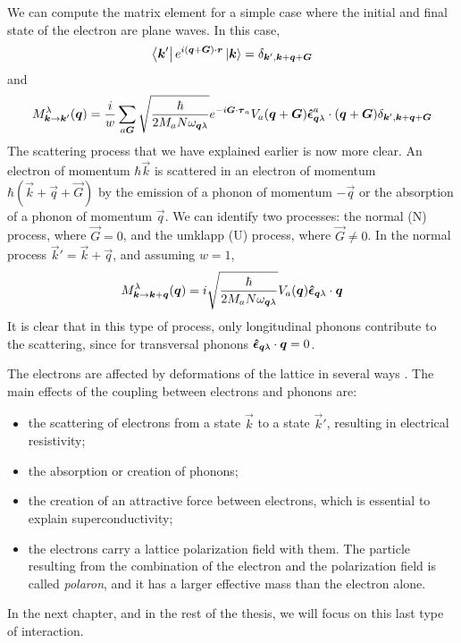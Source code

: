 We can compute the matrix element for a simple case where the initial and final state of the electron are plane waves. In this case,
\begin{equation}
    \bra{\mathbf{\boldsymbol{k}}'} e^{i(\mathbf{\boldsymbol{q}} + \mathbf{\boldsymbol{G}})\cdot \mathbf{\boldsymbol{r}}} \ket{\mathbf{\boldsymbol{k}}} = \delta_{\mathbf{\boldsymbol{k}}', \mathbf{\boldsymbol{k}}+\mathbf{\boldsymbol{q}}+\mathbf{\boldsymbol{G}}}
\end{equation}
and
\begin{equation}
    M_{\mathbf{\boldsymbol{k}} \rightarrow \mathbf{\boldsymbol{k}}'}^\lambda(\mathbf{\boldsymbol{q}}) =  \frac{i}{w} \sum_{a\mathbf{\boldsymbol{G}}} \sqrt{\frac{\hbar}{2M_aN\omega_{\mathbf{\boldsymbol{q}}\lambda}}}  e^{-i \mathbf{\boldsymbol{G}} \cdot \mathbf{\boldsymbol{\tau}}_a} V_a(\mathbf{\boldsymbol{q}} + \mathbf{\boldsymbol{G}}) \mathbf{\boldsymbol{\hat{\epsilon}}}_{\mathbf{\boldsymbol{q}}\lambda}^a \cdot (\mathbf{\boldsymbol{q}}+\mathbf{\boldsymbol{G}}) \delta_{\mathbf{\boldsymbol{k}}', \mathbf{\boldsymbol{k}}+\mathbf{\boldsymbol{q}}+\mathbf{\boldsymbol{G}}}
\end{equation}
The scattering process that we have explained earlier is now more clear. An electron of momentum $\hbar\vec{k}$ is scattered in an electron of momentum $\hbar (\vec{k}+\vec{q}+\vec{G})$ by the emission of a phonon of momentum $-\vec{q}$ or the absorption of a phonon of momentum $\vec{q}$. We can identify two processes: the normal (N) process, where $\vec{G} = 0$, and the umklapp (U) process, where $\vec{G} \neq 0$. In the normal process $\vec{k}' = \vec{k} + \vec{q}$, and assuming $w=1$,
\begin{equation}
    M_{\mathbf{\boldsymbol{k}} \rightarrow \mathbf{\boldsymbol{k}} + \mathbf{\boldsymbol{q}}}^\lambda(\mathbf{\boldsymbol{q}}) =  i \sqrt{\frac{\hbar}{2M_aN\omega_{\mathbf{\boldsymbol{q}}\lambda}}}   V_a(\mathbf{\boldsymbol{q}}) \mathbf{\boldsymbol{\hat{\epsilon}}}_{\mathbf{\boldsymbol{q}}\lambda} \cdot \mathbf{\boldsymbol{q}}
\end{equation}
It is clear that in this type of process, only longitudinal phonons contribute to the scattering, since for transversal phonons $\mathbf{\boldsymbol{\hat{\epsilon}}}_{\mathbf{\boldsymbol{q}}\lambda} \cdot \mathbf{\boldsymbol{q}} = 0$.

The electrons are affected by deformations of the lattice in several ways \cite{kittel1987}. The main effects of the coupling between  electrons and phonons are:
\begin{itemize}
    \item the scattering of electrons from a state $\vec{k}$ to a state $\vec{k}'$, resulting in electrical resistivity;
    \item the absorption or creation of phonons;
    \item the creation of an attractive force between electrons, which is essential to explain superconductivity;
    \item the electrons carry a lattice polarization field with them. The particle resulting from the combination of the electron and the polarization field is called \emph{polaron}, and it has a larger effective mass than the electron alone.
\end{itemize}
In the next chapter, and in the rest of the thesis, we will focus on this last type of interaction.